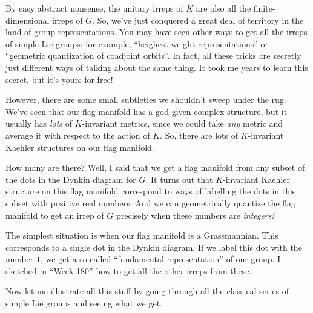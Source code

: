 \documentclass{article}
\begin{document}
By easy abstract nonsense, the unitary irreps of \(K\) are also all the
finite-dimensional irreps of \(G\). So, we've just conquered a great
deal of territory in the land of group representations. You may have
seen other ways to get all the irreps of simple Lie groups: for example,
``heighest-weight representations'' or ``geometric quantization of
coadjoint orbits''. In fact, all these tricks are secretly just
different ways of talking about the same thing. It took me years to
learn this secret, but it's yours for free!

However, there are some small subtleties we shouldn't sweep under the
rug. We've seen that our flag manifold has a god-given complex
structure, but it usually has \emph{lots} of \(K\)-invariant metrics,
since we could take \emph{any} metric and average it with respect to the
action of \(K\). So, there are lots of \(K\)-invariant Kaehler
structures on our flag manifold.

How many are there? Well, I said that we get a flag manifold from any
subset of the dots in the Dynkin diagram for \(G\). It turns out that
\(K\)-invariant Kaehler structure on this flag manifold correspond to
ways of labelling the dots in this subset with positive real numbers.
And we can geometrically quantize the flag manifold to get an irrep of
\(G\) precisely when these numbers are \emph{integers!}

The simplest situation is when our flag manifold is a Grassmannian. This
corresponds to a single dot in the Dynkin diagram. If we label this dot
with the number \(1\), we get a so-called ``fundamental representation''
of our group. I sketched in \protect\hyperlink{week180}{``Week 180''}
how to get all the other irreps from these.

Now let me illustrate all this stuff by going through all the classical
series of simple Lie groups and seeing what we get.
\end{document}
